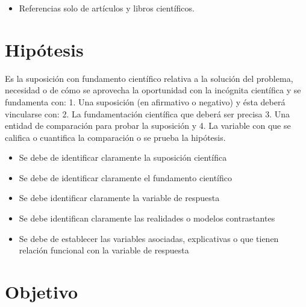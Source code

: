\begin{itemize}
        \item Referencias solo de artículos y libros científicos.
    \end{itemize}
    \section{Hipótesis}
    
    Es la suposición con fundamento científico relativa a la solución del problema, necesidad o de cómo se aprovecha la oportunidad con la incógnita científica y se fundamenta con: 1. Una suposición (en afirmativo o negativo) y ésta deberá vincularse con:
    2. La fundamentación científica que deberá ser precisa 3. Una entidad de comparación para probar la suposición y
    4. La variable con que se califica o cuantifica la comparación o se prueba la hipótesis.
    
    \begin{itemize}
        \item Se debe de identificar claramente la suposición científica
        \item Se debe de identificar claramente el fundamento científico
        \item Se debe identificar claramente la variable de respuesta
        \item Se debe identifican claramente las realidades o modelos contrastantes
        \item Se debe de establecer las variables asociadas, explicativas o que tienen relación funcional con la variable de respuesta
    \end{itemize}
    \section{Objetivo}
    
